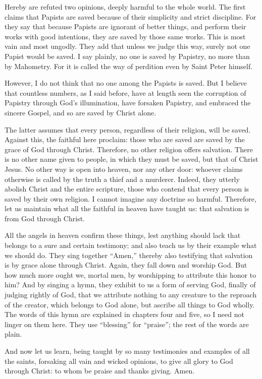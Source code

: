 Hereby are refuted two opinions, deeply harmful to the whole world. The first claims that Papists are saved because of their simplicity and strict discipline. For they say that because Papists are ignorant of better things, and perform their works with good intentions, they are saved by those same works. This is most vain and most ungodly. They add that unless we judge this way, surely not one Papist would be saved. I say plainly, no one is saved by Papistry, no more than by Mahometry. For it is called the way of perdition even by Saint Peter himself.

However, I do not think that no one among the Papists is saved. But I believe that countless numbers, as I said before, have at length seen the corruption of Papistry through God’s illumination, have forsaken Papistry, and embraced the sincere Gospel, and so are saved by Christ alone.

The latter assumes that every person, regardless of their religion, will be saved. Against this, the faithful here proclaim: those who are saved are saved by the grace of God through Christ. Therefore, no other religion offers salvation. There is no other name given to people, in which they must be saved, but that of Christ Jesus. No other way is open into heaven, nor any other door: whoever claims otherwise is called by the truth a thief and a murderer. Indeed, they utterly abolish Christ and the entire scripture, those who contend that every person is saved by their own religion. I cannot imagine any doctrine so harmful. Therefore, let us maintain what all the faithful in heaven have taught us: that salvation is from God through Christ.

All the angels in heaven confirm these things, lest anything should lack that belongs to a sure and certain testimony; and also teach us by their example what we should do. They sing together “Amen,” thereby also testifying that salvation is by grace alone through Christ. Again, they fall down and worship God. But how much more ought we, mortal men, by worshipping to attribute this honor to him? And by singing a hymn, they exhibit to us a form of serving God, finally of judging rightly of God, that we attribute nothing to any creature to the reproach of the creator, which belongs to God alone, but ascribe all things to God wholly. The words of this hymn are explained in chapters four and five, so I need not linger on them here. They use “blessing” for “praise”; the rest of the words are plain.

And now let us learn, being taught by so many testimonies and examples of all the saints, forsaking all vain and wicked opinions, to give all glory to God through Christ: to whom be praise and thanks giving. Amen.
